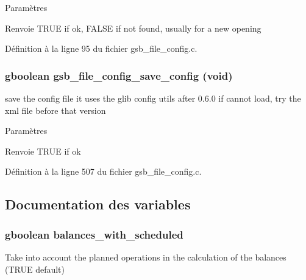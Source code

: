 \begin{DoxyParams}{Paramètres}
\item[{\em }]\end{DoxyParams}
\begin{DoxyReturn}{Renvoie}
TRUE if ok, FALSE if not found, usually for a new opening 
\end{DoxyReturn}


Définition à la ligne 95 du fichier gsb\_\-file\_\-config.c.

\subsubsection[{gsb\_\-file\_\-config\_\-save\_\-config}]{\setlength{\rightskip}{0pt plus 5cm}gboolean gsb\_\-file\_\-config\_\-save\_\-config (void)}\label{gsb__file__config_8c_a74fd03c5b1ed804d94add079eca960fa}
save the config file it uses the glib config utils after 0.6.0 if cannot load, try the xml file before that version


\begin{DoxyParams}{Paramètres}
\item[{\em }]\end{DoxyParams}
\begin{DoxyReturn}{Renvoie}
TRUE if ok 
\end{DoxyReturn}


Définition à la ligne 507 du fichier gsb\_\-file\_\-config.c.



\subsection{Documentation des variables}
\subsubsection[{balances\_\-with\_\-scheduled}]{\setlength{\rightskip}{0pt plus 5cm}gboolean {\bf balances\_\-with\_\-scheduled}}\label{gsb__file__config_8c_a2f70ab8aa9d2a494c0653e8f29eddf40}
Take into account the planned operations in the calculation of the balances (TRUE default) 


